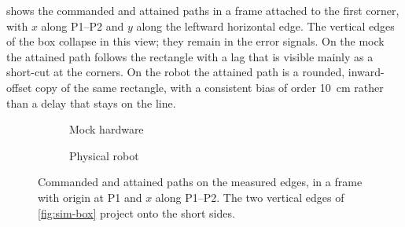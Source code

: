  shows the commanded and attained \ee{} paths in a
frame attached to the first corner, with $x$ along P1--P2 and $y$ along
the leftward horizontal edge. The vertical edges of the box collapse in
this view; they remain in the error signals. On the mock the attained
path follows the rectangle with a lag that is visible mainly as a
short-cut at the corners. On the robot the attained path is a rounded,
inward-offset copy of the same rectangle, with a consistent bias of
order \qty{10}{\centi\meter} rather than a delay that stays on the
line.

\begin{figure}[htbp]
  \centering
  \begin{subfigure}[t]{0.48\textwidth}
    \centering
    \caption{Mock hardware}
    \label{fig:hw-path-mock}
  \end{subfigure}
  \hfill
  \begin{subfigure}[t]{0.48\textwidth}
    \centering
    \caption{Physical robot}
    \label{fig:hw-path-real}
  \end{subfigure}
  \caption[Commanded and attained \ee{} paths, mock versus hardware]{%
    Commanded and attained \ee{} paths on the measured edges, in a
    frame with origin at P1 and $x$ along P1--P2. The two vertical
    edges of \cref{fig:sim-box} project onto the short sides.}
  \label{fig:hw-path}
\end{figure}

